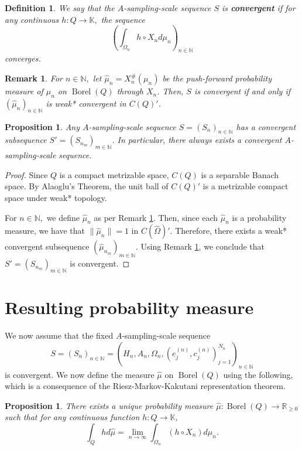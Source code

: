\documentclass[10pt,a4paper]{amsart}
\newtheorem{prop}[thm]{Proposition}
\newtheorem{definition}[thm]{Definition}
\newtheorem{remark}[thm]{Remark}
\def \Borel{\operatorname{Borel}}
\def \HOM{\hat{\Omega}}
\def \HMU{\hat{\mu}}
\begin{document}
\begin{definition}
	We say that the $A$-sampling-scale sequence $S$ is \textbf{convergent} if for any continuous $h:Q\rightarrow\mathbb{K},$ the sequence $$\left(\int_{\Omega_n} h\circ X_n d\mu_n\right)_{n\in\mathbb{N}}$$ converges.
\end{definition}
\begin{remark}\label{remark_weak_star_equivalence}
	For $n\in\mathbb{N},$ let $\HMU_n=X_n^{\#}(\mu_n)$ be the push-forward probability measure of $\mu_n$ on $\Borel(Q)$ through $X_n$. Then, $S$ is convergent if and only if $(\HMU_n)_{n\in\mathbb{N}}$ is weak* convergent in $C(Q)'$.
\end{remark}
\begin{prop}
	Any $A$-sampling-scale sequence $S=(S_n)_{n\in\mathbb{N}}$ has a convergent subsequence $S'=(S_{n_m})_{m\in\mathbb{N}}$. In particular, there always exists a convergent $A$-sampling-scale sequence.
\end{prop}
\begin{proof}
	Since $Q$ is a compact metrizable space, $C(Q)$ is a separable Banach space. By Alaoglu's Theorem, the unit ball of $C(Q)'$ is a metrizable compact space under weak* topology. 
	
	For $n\in\mathbb{N},$ we define $\HMU_n$ as per Remark \ref{remark_weak_star_equivalence}. Then, since each $\HMU_n$ is a probability measure, we have that $\|\HMU_n\|=1$ in $C(\HOM)'$. Therefore, there exists a weak* convergent subsequence $(\HMU_{n_m})_{m\in\mathbb{N}}$. Using Remark \ref{remark_weak_star_equivalence}, we conclude that  $S'=(S_{n_m})_{m\in\mathbb{N}}$ is convergent.
\end{proof}
\section{Resulting probability measure}
We now assume that the fixed $A$-sampling-scale sequence $$S=(S_n)_{n\in\mathbb{N}}=(H_n,A_n,\Omega_n,(e_j^{(n)},c_j^{(n)})_{j=1}^{N_n})_{n\in\mathbb{N}}$$ is convergent. We now define the measure $\HMU$ on $\Borel(Q)$ using the following, which is a consequence of the Riesz-Markov-Kakutani representation theorem.

\begin{prop}\label{proposition_riesz_markov}
	There exists a unique probability measure $\HMU:\Borel(Q)\rightarrow\mathbb{R}_{\geq 0}$ such that for any continuous function $h:Q\rightarrow\mathbb{K}$, $$\int_{Q}h d\HMU=\lim_{n\rightarrow\infty}\int_{\Omega_n}(h\circ X_n)d\mu_n.$$
\end{prop}
\end{document}
